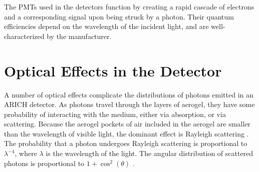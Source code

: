 The \ac{PMT}s used in the detectors function by creating a rapid cascade of electrons and a corresponding signal upon being struck by a photon.
Their quantum efficiencies depend on the wavelength of the incident light, and are well-characterized by the manufacturer.

\section{Optical Effects in the Detector}
\label{sec:optics}
A number of optical effects complicate the distributions of photons emitted in an ARICH detector.
As photons travel through the layers of aerogel, they have some probability of interacting with the medium, either via absorption, or via scattering.
Because the aerogel  pockets of air included in the aerogel are smaller than the wavelength of visible light, the dominant effect is Rayleigh scattering \cite{aerogelRefraction}. 
The probability that a photon  undergoes Rayleigh scattering is proportional to $\lambda^{-4}$, where $\lambda$ is the wavelength of the light.
The angular distribution of scattered photons is proportional to $1 + \cos^2(\theta)$ \cite{rayleigh}.


\endinput

Any text after an \endinput is ignored.
You could put scraps here or things in progress.
